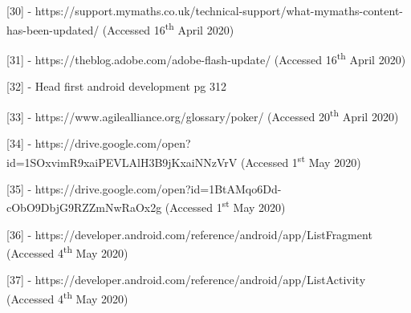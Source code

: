 \documentclass{article}
\begin{document}
[30] - https://support.mymaths.co.uk/technical-support/what-mymaths-content-has-been-updated/ (Accessed 16\textsuperscript{th} April 2020) \par

[31] - https://theblog.adobe.com/adobe-flash-update/ (Accessed 16\textsuperscript{th} April 2020) \par

[32] - Head first android development pg 312 \par

[33] - https://www.agilealliance.org/glossary/poker/ (Accessed 20\textsuperscript{th} April 2020) \par

[34] - https://drive.google.com/open?id=1SOxvimR9xaiPEVLAlH3B9jKxaiNNzVrV (Accessed 1\textsuperscript{st} May 2020) \par

[35] - https://drive.google.com/open?id=1BtAMqo6Dd-cObO9DbjG9RZZmNwRaOx2g (Accessed 1\textsuperscript{st} May 2020) \par

[36] - https://developer.android.com/reference/android/app/ListFragment (Accessed 4\textsuperscript{th} May 2020) \par

[37] - https://developer.android.com/reference/android/app/ListActivity (Accessed 4\textsuperscript{th} May 2020)
\end{document}
